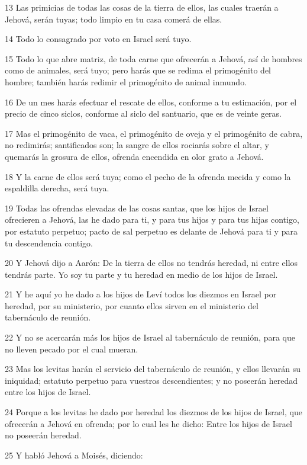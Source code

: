 \par 13 Las primicias de todas las cosas de la tierra de ellos, las cuales traerán a Jehová, serán tuyas; todo limpio en tu casa comerá de ellas.
\par 14 Todo lo consagrado por voto en Israel será tuyo.
\par 15 Todo lo que abre matriz, de toda carne que ofrecerán a Jehová, así de hombres como de animales, será tuyo; pero harás que se redima el primogénito del hombre; también harás redimir el primogénito de animal inmundo.
\par 16 De un mes harás efectuar el rescate de ellos, conforme a tu estimación, por el precio de cinco siclos,  conforme al siclo del santuario, que es de veinte geras.
\par 17 Mas el primogénito de vaca, el primogénito de oveja y el primogénito de cabra, no redimirás; santificados son; la sangre de ellos rociarás sobre el altar, y quemarás la grosura de ellos, ofrenda encendida en olor grato a Jehová.
\par 18 Y la carne de ellos será tuya; como el pecho de la ofrenda mecida y como la espaldilla derecha, será tuya.
\par 19 Todas las ofrendas elevadas de las cosas santas, que los hijos de Israel ofrecieren a Jehová, las he dado para ti, y para tus hijos y para tus hijas contigo, por estatuto perpetuo; pacto de sal perpetuo es delante de Jehová para ti y para tu descendencia contigo.
\par 20 Y Jehová dijo a Aarón: De la tierra de ellos no tendrás heredad, ni entre ellos tendrás parte. Yo soy tu parte y tu heredad en medio de los hijos de Israel.
\par 21 Y he aquí yo he dado a los hijos de Leví todos los diezmos  en Israel por heredad, por su ministerio, por cuanto ellos sirven en el ministerio del tabernáculo de reunión.
\par 22 Y no se acercarán más los hijos de Israel al tabernáculo de reunión, para que no lleven pecado por el cual mueran.
\par 23 Mas los levitas harán el servicio del tabernáculo de reunión, y ellos llevarán su iniquidad; estatuto perpetuo para vuestros descendientes; y no poseerán heredad entre los hijos de Israel.
\par 24 Porque a los levitas he dado por heredad los diezmos de los hijos de Israel, que ofrecerán a Jehová en ofrenda; por lo cual les he dicho: Entre los hijos de Israel no poseerán heredad.
\par 25 Y habló Jehová a Moisés, diciendo:
